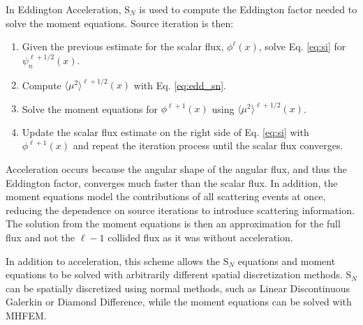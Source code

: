 \documentclass{anstrans}
\newcommand{\SN}{S$_N$\xspace}
\newcommand{\edd}{\langle \mu^2 \rangle}
\begin{document}
	In Eddington Acceleration, \SN is used to compute the Eddington factor needed to solve the moment equations. Source iteration is then:  
		\begin{enumerate}
			\item Given the previous estimate for the scalar flux, $\phi^{\ell}(x)$, solve Eq. \ref{eq:si} for $\psi_n^{\ell+1/2}(x)$. 
			\item Compute $\edd^{\ell+1/2}(x)$ with Eq. \ref{eq:edd_sn}. 
			\item Solve the moment equations for $\phi^{\ell+1}(x)$ using $\edd^{\ell+1/2}(x)$. 
			\item Update the scalar flux estimate on the right side of Eq. \ref{eq:si} with $\phi^{\ell+1}(x)$ and repeat the iteration process until the scalar flux converges. 
		\end{enumerate}

	Acceleration occurs because the angular shape of the angular flux, and thus the Eddington factor, converges much faster than the scalar flux. In addition, the moment equations model the contributions of all scattering events at once, reducing the dependence on source iterations to introduce scattering information. The solution from the moment equations is then an approximation for the full flux and not the $\ell - 1$ collided flux as it was without acceleration. 

	In addition to acceleration, this scheme allows the \SN equations and moment equations to be solved with arbitrarily different spatial discretization methods. \SN can be spatially discretized using normal methods, such as Linear Discontinuous Galerkin or Diamond Difference, while the moment equations can be solved with MHFEM. 
\end{document}
